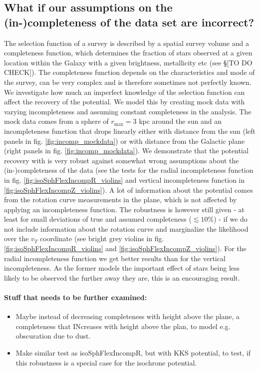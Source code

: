 \subsection{What if our assumptions on the (in-)completeness of the data set are incorrect?}

The selection function of a survey is described by a spatial survey volume and a completeness function, which determines the fraction of stars observed at a given location within the Galaxy with a given brightness, metallicity etc (see \S[TO DO CHECK]). The completeness function depends on the characteristics and mode of the survey, can be very complex and is therefore sometimes not perfectly known. We investigate how much an imperfect knowledge of the selection function can affect the recovery of the potential. We model this by creating mock data with varying incompleteness and assuming constant completeness in the analysis. The mock data comes from a sphere of $r_\text{max} = 3$ kpc around the sun and an incompleteness function that drops linearly either with distance from the sun (left panels in fig. \ref{fig:incomp_mockdata}) or with distance from the Galactic plane (right panels in fig. \ref{fig:incomp_mockdata}). We demonstrate that the potential recovery with  \RM is very robust against somewhat wrong assumptions about the (in-)completeness of the data (see the tests for the radial incompleteness function in fig. \ref{fig:isoSphFlexIncompR_violins} and vertical incompleteness function in \ref{fig:isoSphFlexIncompZ_violins}). A lot of information about the potential comes from the rotation curve measurements in the plane, which is not affected by applying an incompleteness function. The robustness is however still given - at least for small deviations of true and assumed completeness ($\lesssim 10\%$) - if we do not include information about the rotation curve and marginalize the likelihood over the $v_T$ coordinate (see bright grey violins in fig. \ref{fig:isoSphFlexIncompR_violins} and \ref{fig:isoSphFlexIncompZ_violins}). For the radial incompleteness function we get better results than for the vertical incompleteness. As the former models the important effect of stars being less likely to be observed the further away they are, this is an encouraging result.

\paragraph{Stuff that needs to be further examined:}
\begin{itemize}
\item Maybe instead of decreasing completeness with height above the plane, a completeness that INcreases with height above the plan, to model e.g. obscuration due to dust.
\item Make similar test as isoSphFlexIncompR, but with KKS potential, to test, if this robustness is a special case for the isochrone potential.
\end{itemize}




